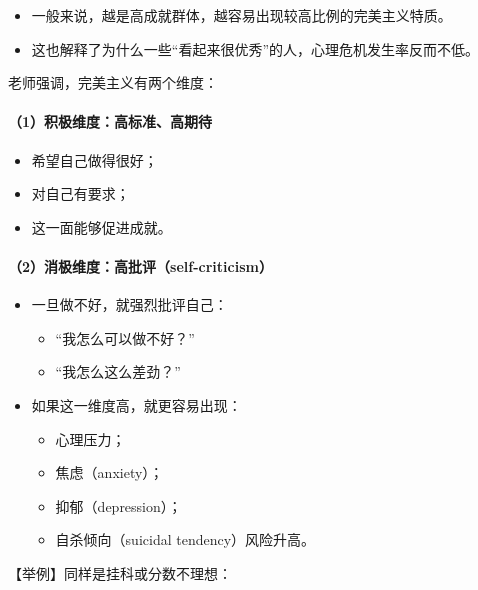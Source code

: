 \documentclass[
  chinese,
  9pt,
  a4paper,
]{ctexart}
\providecommand{\tightlist}{%
  \setlength{\itemsep}{0pt}\setlength{\parskip}{0pt}}
\begin{document}
\begin{itemize}
\tightlist
\item
  一般来说，越是高成就群体，越容易出现较高比例的完美主义特质。
\item
  这也解释了为什么一些``看起来很优秀''的人，心理危机发生率反而不低。
\end{itemize}

老师强调，完美主义有两个维度：

\paragraph{（1）积极维度：高标准、高期待}\label{ux79efux6781ux7ef4ux5ea6ux9ad8ux6807ux51c6ux9ad8ux671fux5f85}

\begin{itemize}
\tightlist
\item
  希望自己做得很好；
\item
  对自己有要求；
\item
  这一面能够促进成就。
\end{itemize}

\paragraph{（2）消极维度：高批评（self-criticism）}\label{ux6d88ux6781ux7ef4ux5ea6ux9ad8ux6279ux8bc4self-criticism}

\begin{itemize}
\item
  一旦做不好，就强烈批评自己：

  \begin{itemize}
  \tightlist
  \item
    ``我怎么可以做不好？''
  \item
    ``我怎么这么差劲？''
  \end{itemize}
\item
  如果这一维度高，就更容易出现：

  \begin{itemize}
  \tightlist
  \item
    心理压力；
  \item
    焦虑（anxiety）；
  \item
    抑郁（depression）；
  \item
    自杀倾向（suicidal tendency）风险升高。
  \end{itemize}
\end{itemize}

【举例】同样是挂科或分数不理想：
\end{document}
